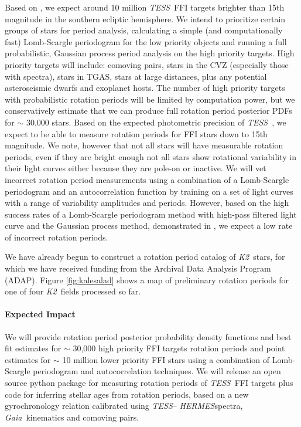 \documentclass[letterpaper,12pt,preprint]{hack_aastex}
\newcommand{\Ktwo}{{\it K2}}
\newcommand{\ktwo}{\Ktwo}
\newcommand{\TESS}{{\it TESS}}
\newcommand{\tess}{{\it TESS}}
\newcommand{\Gaia}{{\it Gaia}}
\newcommand{\HERMES}{{\it HERMES}}
\begin{document}
Based on \citet{sullivan2015}, we expect around 10 million \TESS\ FFI
targets brighter than 15th magnitude in the southern ecliptic hemisphere.
We intend to prioritize certain groups of stars for period analysis,
calculating a simple (and computationally fast) Lomb-Scargle periodogram for
the low priority objects and running a full probabilistic, Gaussian process
period analysis on the high priority targets.
High priority targets will include: comoving pairs, stars in the CVZ
(especially those with spectra), stars in TGAS, stars at large distances, plus
any potential asteroseismic dwarfs and exoplanet hosts.
The number of high priority targets with probabilistic rotation periods will
be limited by computation power, but we conservatively estimate that we can
produce full rotation period posterior PDFs for $\sim$ 30,000 stars.
Based on the expected photometric precision of \tess\ \citep{sullivan2015}, we
expect to be able to measure rotation periods for FFI stars down to 15th
magnitude.
We note, however that not all stars will have measurable rotation periods,
even if they are bright enough not all stars show rotational variability in
their light curves either because they are pole-on or inactive.
We will vet incorrect rotation period measurements using a combination of a
Lomb-Scargle periodogram and an autocorrelation function by
training on a set of light curves with a range of variability amplitudes and
periods.
However, based on the high success rates of a Lomb-Scargle periodogram method
with high-pass filtered light curve and the Gaussian process method,
demonstrated in \citet{angus2017}, we expect a low rate of incorrect rotation
periods.

We have already begun to construct a rotation period catalog of \ktwo\ stars,
for which we have received funding from the Archival Data Analysis Program
(ADAP).
Figure \ref{fig:kalesalad} shows a map of preliminary rotation periods for one
of four \ktwo\ fields processed so far.


\paragraph{Expected Impact}
We will provide rotation period posterior probability density functions and
best fit estimates for $\sim$ 30,000 high priority FFI targets rotation
periods and point estimates for $\sim$ 10 million lower priority FFI stars
using a combination of Lomb-Scargle periodogram and autocorrelation
techniques.
We will release an open source python package for measuring rotation periods
of \tess\ FFI targets plus code for inferring stellar ages from rotation
periods, based on a new gyrochronology relation calibrated using \TESS --
\HERMES spectra, \Gaia\ kinematics and comoving pairs.
\end{document}
